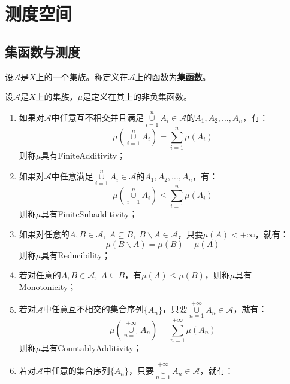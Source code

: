 \section{测度空间}
\subsection{集函数与测度}
\begin{definition}
	设$\mathscr{A}$是$X$上的一个集族。称定义在$\mathscr{A}$上的函数为\textbf{集函数}。
\end{definition}
\begin{definition}
	设$\mathscr{A}$是$X$上的集族，$\mu$是定义在其上的非负集函数。
	\begin{enumerate}
		\item 如果对$\mathscr{A}$中任意互不相交并且满足$\underset{i=1}{\overset{n}{\cup}}A_i\in\mathscr{A}$的$A_1,A_2,\dots,A_n$，有：
		\begin{equation*}
			\mu\left(\underset{i=1}{\overset{n}{\cup}}A_i\right)=\sum_{i=1}^{n}\mu(A_i)
		\end{equation*}
		则称$\mu$具有\gls{FiniteAdditivity}；
		\item 如果对$\mathscr{A}$中任意满足$\underset{i=1}{\overset{n}{\cup}}A_i\in\mathscr{A}$的$A_1,A_2,\dots,A_n$，有：
		\begin{equation*}
			\mu\left(\underset{i=1}{\overset{n}{\cup}}A_i\right)\leqslant\sum_{i=1}^{n}\mu(A_i)
		\end{equation*}
		则称$\mu$具有\gls{FiniteSubadditivity}；
		\item 如果对任意的$A,B\in\mathscr{A},\;A\subseteq B,\;B\backslash A\in\mathscr{A}$，只要$\mu(A)<+\infty$，就有：
		\begin{equation*}
			\mu(B\backslash A)=\mu(B)-\mu(A)
		\end{equation*}
		则称$\mu$具有\gls{Reducibility}；
		\item 若对任意的$A,B\in\mathscr{A},\;A\subseteq B$，有$\mu(A)\leqslant\mu(B)$，则称$\mu$具有\gls{Monotonicity}；
		\item 若对$\mathscr{A}$中任意互不相交的集合序列$\{A_n\}$，只要$\underset{n=1}{\overset{+\infty}{\cup}}A_n\in\mathscr{A}$，就有：
		\begin{equation*}
			\mu\left(\underset{n=1}{\overset{+\infty}{\cup}}A_n\right)=\sum_{n=1}^{+\infty}\mu(A_n)
		\end{equation*}
		则称$\mu$具有\gls{CountablyAdditivity}；
		\item 若对$\mathscr{A}$中任意的集合序列$\{A_n\}$，只要$\underset{n=1}{\overset{+\infty}{\cup}}A_n\in\mathscr{A}$，就有：

\end{enumerate}
\end{definition}

